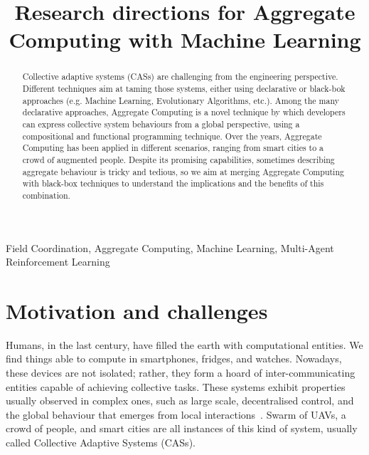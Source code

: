 \documentclass[conference]{IEEEtran}
\begin{document}
\title{Research directions for Aggregate Computing with Machine Learning}

\author{
}

\maketitle
\begin{abstract}
    Collective adaptive systems (CASs) are challenging from the engineering perspective. 
%
    Different techniques aim at taming those systems, either using declarative or black-bok approaches (e.g. Machine Learning, Evolutionary Algorithms, etc.).
%
    Among the many declarative approaches, Aggregate Computing is a novel technique by which developers can express collective system behaviours from a global perspective, using a compositional and functional programming technique.
%
    Over the years, Aggregate Computing has been applied in different scenarios, ranging from smart cities to a crowd of augmented people. 
%
    Despite its promising capabilities, sometimes describing aggregate behaviour is tricky and tedious, so we aim at merging Aggregate Computing with black-box techniques to understand the implications and the benefits of this combination.
\end{abstract}
\begin{IEEEkeywords}
Field Coordination, Aggregate Computing, Machine Learning, Multi-Agent Reinforcement Learning
\end{IEEEkeywords}

\section{Motivation and challenges}
Humans, in the last century, have filled the earth with computational entities. 
%
We find things able to compute in smartphones, fridges, and watches. %
%
Nowadays, these devices are not isolated; rather, they form a hoard of inter-communicating entities capable of achieving collective tasks.
% 
These systems exhibit properties usually observed in complex ones, such as large scale, 
decentralised control, and the global behaviour that emerges from local interactions~\cite{DBLP:conf/huc/Ferscha15}.
% 
Swarm of UAVs, a crowd of people, and smart cities are all instances of this kind of system, usually called Collective Adaptive Systems (CASs).
\end{document}
